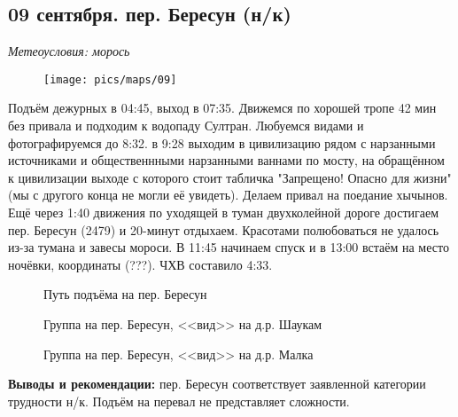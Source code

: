 \subsection{09 сентября. пер. Бересун (н/к)}
\textit{Метеоусловия: морось}

\begin{figure}[h!]
	\centering
	\texttt{[image: pics/maps/09]}
	\label{fig:09}
\end{figure}

Подъём дежурных в 04:45, выход в 07:35. Движемся по хорошей тропе 42 мин без привала и подходим к водопаду Султран. Любуемся видами и фотографируемся до 8:32. в 9:28 выходим в цивилизацию рядом с нарзанными источниками и общественнными нарзанными ваннами по мосту, на обращённом к цивилизации выходе с которого стоит табличка "Запрещено! Опасно для жизни" (мы с другого конца не могли её увидеть). Делаем привал на поедание хычынов. Ещё через 1:40 движения по уходящей в туман двухколейной дороге достигаем пер. Бересун (2479) и 20-минут отдыхаем. Красотами полюбоваться не удалось из-за тумана и завесы мороси. В 11:45 начинаем спуск и в 13:00 встаём на место ночёвки, координаты (???). ЧХВ составило 4:33.


\begin{figure}[h!]
	\centering
	\caption{Путь подъёма на пер. Бересун}
	\label{fig:beresun1}
\end{figure}


\begin{figure}[h!]
	\centering
	\caption{Группа на пер. Бересун, <<вид>> на д.р. Шаукам}
	\label{fig:beresun2}
\end{figure}

\begin{figure}[h!]
	\centering
	\caption{Группа на пер. Бересун, <<вид>> на д.р. Малка}
	\label{fig:beresun3}
\end{figure}



\textbf{Выводы и рекомендации:} пер. Бересун соответствует заявленной категории трудности н/к.  Подъём на перевал не представляет сложности. 

\clearpage
